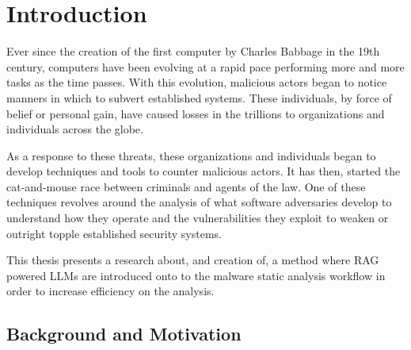 \chapter{Introduction}
\label{sec:Introduction}
\label{Chapter1} %

Ever since the creation of the first computer by Charles Babbage in the 19th century, computers
have been evolving at a rapid pace performing more and more tasks as the time passes. With this
evolution, malicious actors began to notice manners in which to subvert established systems. These
individuals, by force of belief or personal gain, have caused losses in the trillions to
organizations and individuals across the globe.

As a response to these threats, these organizations and individuals began to develop techniques and
tools to counter malicious actors. It has then, started the cat-and-mouse race between criminals
and agents of the law. One of these techniques revolves around the analysis of what software
adversaries develop to understand how they operate and the vulnerabilities they exploit to weaken
or outright topple established security systems.

This thesis presents a research about, and creation of, a method where RAG powered LLMs are
introduced onto to the malware static analysis workflow in order to increase efficiency on the
analysis.

\section{Background and Motivation}

